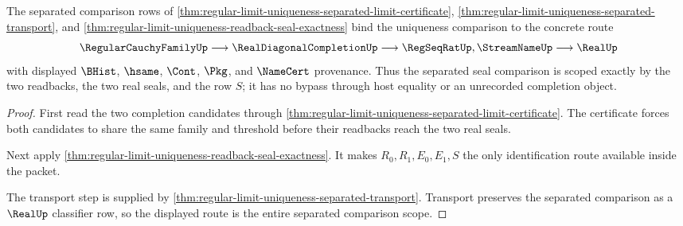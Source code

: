 \begin{theorem}
\label{thm:regular-limit-uniqueness-separated-comparison-scope}
The separated comparison rows of \autoref{thm:regular-limit-uniqueness-separated-limit-certificate}, \autoref{thm:regular-limit-uniqueness-separated-transport}, and \autoref{thm:regular-limit-uniqueness-readback-seal-exactness} bind the uniqueness comparison to the concrete route
$$
\RegularCauchyFamilyUp \longrightarrow \RealDiagonalCompletionUp \longrightarrow \RegSeqRatUp,\StreamNameUp \longrightarrow \RealUp
$$
with displayed $\BHist$, $\hsame$, $\Cont$, $\Pkg$, and $\NameCert$ provenance. Thus the separated seal comparison is scoped exactly by the two readbacks, the two real seals, and the row $S$; it has no bypass through host equality or an unrecorded completion object.
\end{theorem}
\begin{proof}
First read the two completion candidates through \autoref{thm:regular-limit-uniqueness-separated-limit-certificate}. The certificate forces both candidates to share the same family and threshold before their readbacks reach the two real seals.

Next apply \autoref{thm:regular-limit-uniqueness-readback-seal-exactness}. It makes $R_0,R_1,E_0,E_1,S$ the only identification route available inside the packet.

The transport step is supplied by \autoref{thm:regular-limit-uniqueness-separated-transport}. Transport preserves the separated comparison as a $\RealUp$ classifier row, so the displayed route is the entire separated comparison scope.
\end{proof}

